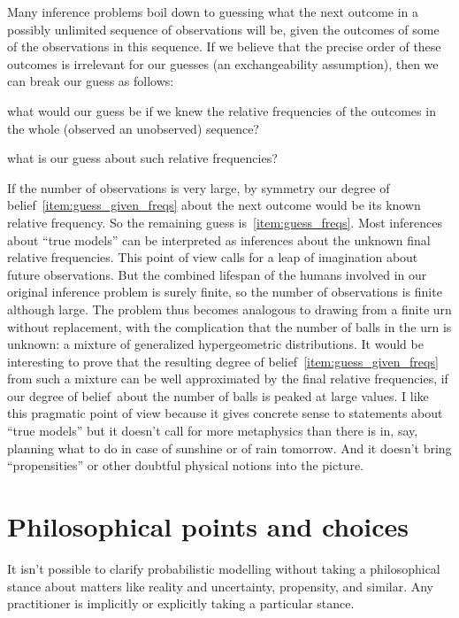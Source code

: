 \documentclass[\ifafour a4paper,12pt,\else a5paper,10pt,\fi%
onecolumn,oneside,article,%
british%
]{memoir}
\theoremstyle{remark}
\theoremstyle{innote}
\renewcommand*{\|}{\nonscript\,\vert\nonscript\;\mathopen{}}
\newcommand*{\dob}{degree of belief}
\begin{document}
Many inference problems boil down to guessing what the next outcome in a
possibly unlimited sequence of observations will be, given the outcomes of
some of the observations in this sequence. If we believe that the precise
order of these outcomes is irrelevant for our guesses (an exchangeability
assumption), then we can break our guess as follows:
\begin{enumerate*}[(\alph*)]
\item\label{item:guess_given_freqs}what would our guess be if we knew the
  relative frequencies of the outcomes in the whole (observed an
  unobserved) sequence?
\item\label{item:guess_freqs}what is our guess about such relative frequencies?
\end{enumerate*}
If the number of observations is very large, by symmetry our
\dob~\ref{item:guess_given_freqs} about the next outcome would be its known
relative frequency. So the remaining guess is~\ref{item:guess_freqs}.
Most inferences about \enquote{true models} can be interpreted as
inferences about the unknown final relative frequencies. This point of view
calls for a leap of imagination about future observations. But the combined
lifespan of the humans involved in our original inference problem is surely
finite, so the number of observations is finite although large. The problem
thus becomes analogous to drawing from a finite urn without replacement,
with the complication that the number of balls in the urn is unknown: a
mixture of generalized hypergeometric distributions. It would be
interesting to prove that the resulting \dob~\ref{item:guess_given_freqs}
from such a mixture can be well approximated by the final relative
frequencies, if our \dob\ about the number of balls is peaked at large
values. I like this pragmatic point of view because it gives concrete sense
to statements about \enquote{true models} but it doesn't call for more
metaphysics than there is in, say, planning what to do in case of sunshine or of
rain tomorrow. And it doesn't bring \enquote{propensities} or other
doubtful physical notions into the picture.


\section{Philosophical points and choices}
\label{sec:philosophy}

It isn't possible to clarify probabilistic modelling without taking a
philosophical stance about matters like reality and uncertainty,
propensity, and similar. Any practitioner is implicitly or explicitly
taking a particular stance.
\end{document}
